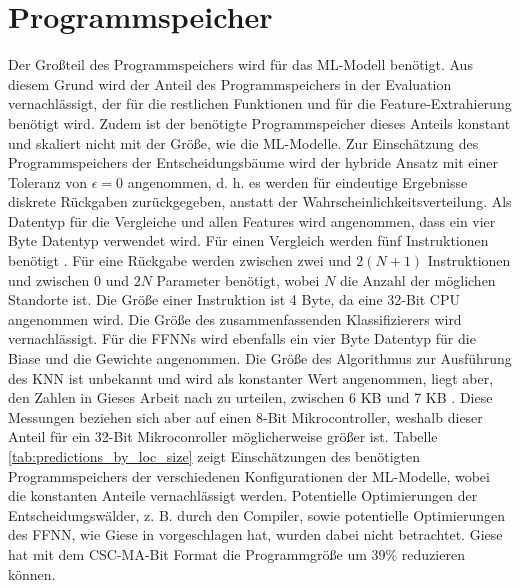 \section{Programmspeicher}
Der Großteil des Programmspeichers wird für das ML-Modell benötigt.
Aus diesem Grund wird der Anteil des Programmspeichers in der Evaluation vernachlässigt,
der für die restlichen Funktionen und für die Feature-Extrahierung benötigt wird.
Zudem ist der benötigte Programmspeicher dieses Anteils konstant und skaliert nicht mit der Größe, wie die ML-Modelle.
\newline
\newline
Zur Einschätzung des Programmspeichers der Entscheidungsbäume wird der hybride Ansatz mit einer Toleranz von $\epsilon=0$ angenommen,
d. h. es werden für eindeutige Ergebnisse diskrete Rückgaben zurückgegeben, anstatt der Wahrscheinlichkeitsverteilung.
Als Datentyp für die Vergleiche und allen Features wird angenommen, dass ein vier Byte Datentyp verwendet wird.
Für einen Vergleich werden fünf Instruktionen benötigt \cite{dymelThesis}.
Für eine Rückgabe werden zwischen zwei und $2(N+1)$ Instruktionen und zwischen 0 und $2N$ Parameter benötigt,
wobei $N$ die Anzahl der möglichen Standorte ist.
Die Größe einer Instruktion ist 4 Byte, da eine 32-Bit CPU angenommen wird.
Die Größe des zusammenfassenden Klassifizierers wird vernachlässigt.
\newline
\newline
Für die FFNNs wird ebenfalls ein vier Byte Datentyp für die Biase und die Gewichte angenommen.
Die Größe des Algorithmus zur Ausführung des KNN ist unbekannt und wird als konstanter Wert angenommen,
liegt aber, den Zahlen in Gieses Arbeit nach zu urteilen, zwischen 6 KB und 7 KB \cite{gieseThesis}.
Diese Messungen beziehen sich aber auf einen 8-Bit Mikrocontroller, weshalb dieser Anteil für ein 32-Bit Mikroconroller möglicherweise größer ist.
\newline
\newline
Tabelle \ref{tab:predictions_by_loc_size} zeigt Einschätzungen des benötigten Programmspeichers der verschiedenen Konfigurationen der ML-Modelle,
wobei die konstanten Anteile vernachlässigt werden.
Potentielle Optimierungen der Entscheidungswälder, z. B. durch den Compiler,
sowie potentielle Optimierungen des FFNN, wie Giese in \cite{gieseThesis} vorgeschlagen hat, wurden dabei nicht betrachtet.
\newline
\newline
Giese hat mit dem CSC-MA-Bit Format die Programmgröße um 39\% reduzieren können.
